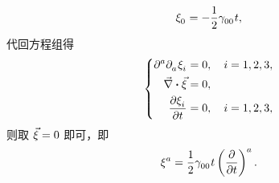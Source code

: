 \begin{xiti}
\begin{zm}
\begin{equation*}
				\tensor{\xi}{_0} = - \frac{1}{2} \tensor{\gamma}{_0_0} t,
			\end{equation*}
			代回方程组得
			\begin{equation*}
				\left\{
					\begin{aligned}
						\tensor{\partial}{^a} \tensor{\partial}{_a} \tensor{\xi}{_i} &= 0 \qc i=1,2,3,\\
						\myvec{\nabla} \vdot \myvec{\xi} &= 0,\\
						\pdv{\tensor{\xi}{_i}}{t} &= 0 \qc i=1,2,3,
					\end{aligned}
				\right.
			\end{equation*}
			则取 $\vec{\xi} = 0$ 即可，即
			\begin{equation*}
				\tensor{\xi}{^a} = \frac{1}{2} \tensor{\gamma}{_0_0} t \tensor{\left( \pdv{t} \right)}{^a}.
			\end{equation*}
		\end{zm}
\end{xiti}